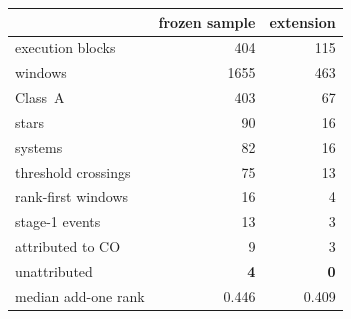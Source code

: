 \begin{tabular}{@{}lrr@{}}
\toprule
 & frozen sample & extension \\
\midrule
execution blocks & 404 & 115 \\
windows & 1655 & 463 \\
\quad Class~A & 403 & 67 \\
stars & 90 & 16 \\
systems & 82 & 16 \\
\midrule
threshold crossings & 75 & 13 \\
rank-first windows & 16 & 4 \\
stage-1 events & 13 & 3 \\
\quad attributed to CO & 9 & 3 \\
\quad unattributed & \textbf{4} & \textbf{0} \\
\midrule
median add-one rank & 0.446 & 0.409 \\
\bottomrule
\end{tabular}
